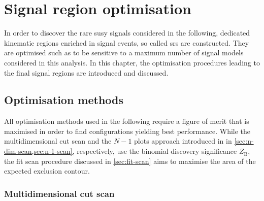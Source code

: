 

\chapter{Signal region optimisation}\label{ch:signal_region_optimisation}

\ifpdf
    \graphicspath{{chapter-optimisation/Figs/Raster/}{chapter-optimisation/Figs/PDF/}{chapter-optimisation/Figs/}}
\else
    \graphicspath{{chapter-optimisation/Figs/Vector/}{chapter-optimisation/Figs/}}
\fi


In order to discover the rare \gls{susy} signals considered in the following, dedicated kinematic regions enriched in signal events, so called \glspl{sr} are constructed.
They are optimised such as to be sensitive to a maximum number of signal models considered in this analysis.
In this chapter, the optimisation procedures leading to the final signal regions are introduced and discussed. 

\section{Optimisation methods}

All optimisation methods used in the following require a figure of merit that is maximised in order to find configurations yielding best performance.
While the multidimensional cut scan and the $N-1$ plots approach introduced in in \cref{sec:n-dim-scan,sec:n-1-scan}, respectively, use the binomial discovery significance $Z_\mathrm{B}$, the fit scan procedure discussed in \cref{sec:fit-scan} aims to maximise the area of the expected exclusion contour.

\subsection{Multidimensional cut scan}\label{sec:n-dim-scan}

